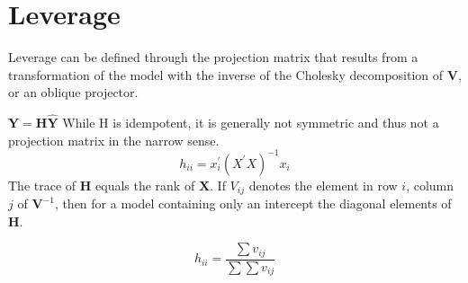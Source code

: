 \documentclass[12pt, a4paper]{report}
\theoremstyle{plain}
\theoremstyle{definition}
\theoremstyle{remark}
\begin{document}

%	
%	

\section{Leverage}

Leverage can be defined through the projection matrix that results from a transformation of the model with the inverse of the Cholesky decomposition of $\boldsymbol{V}$, or an oblique projector.

$\boldsymbol{Y} = \boldsymbol{H}\boldsymbol{\hat{Y}}$
While H is idempotent, it is generally not symmetric and thus not a projection matrix in the narrow sense.
\[ h_{ii} = x^{\prime}_{i}(X^{\prime}X)^{-1}x_{i} \]
The trace of $\boldsymbol{H}$ equals the rank of $\boldsymbol{X}$.
If $V_{ij}$ denotes the element in row $i$, column $j$ of $\boldsymbol{V}^{-1}$, then for a model containing only an intercept the diagonal elements of $\boldsymbol{H}$.

\[ h_{ii} = \frac{\sum v_{ij}}{\sum \sum v_{ij}} \]


\end{document}
